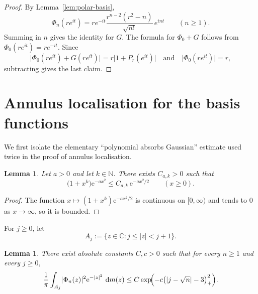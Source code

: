 \documentclass[11pt]{amsart}
\newtheorem{lemma}[theorem]{Lemma}
\theoremstyle{remark}
\newcommand{\C}{\mathbb{C}}
\newcommand{\N}{\mathbb{N}}
\newcommand{\abs}[1]{\lvert #1 \rvert}
\newcommand{\dd}{\,\mathrm{d}}
\newcommand{\ee}{\mathrm{e}}
\begin{document}
\begin{proof}
By Lemma~\ref{lem:polar-basis},
\[
\Phi_n(re^{it})
=
r e^{-it}\frac{r^{n-2}(r^2-n)}{\sqrt{n!}}\,e^{int}
\qquad (n \ge 1).
\]
Summing in $n$ gives the identity for $G$. The formula for $\Phi_0+G$ follows
from $\Phi_0(re^{it})=re^{-it}$. Since
\[
\abs{\Phi_0(re^{it}) + G(re^{it})}
=
r\abs{1 + P_r(e^{it})}
\quad \text{and} \quad
\abs{\Phi_0(re^{it})}=r,
\]
subtracting gives the last claim.
\end{proof}

\section{Annulus localisation for the basis functions}

We first isolate the elementary ``polynomial absorbs Gaussian'' estimate used
twice in the proof of annulus localisation.

\begin{lemma}\label{lem:poly-gauss}
Let $a>0$ and let $k \in \N$. There exists $C_{a,k}>0$ such that
\[
\bigl(1+x^k\bigr)\ee^{-a x^2}
\le
C_{a,k}\,\ee^{-a x^2/2}
\qquad
(x \ge 0).
\]
\end{lemma}

\begin{proof}
The function $x \mapsto (1+x^k)\ee^{-a x^2/2}$ is continuous on $[0,\infty)$
and tends to $0$ as $x\to\infty$, so it is bounded.
\end{proof}

For $j \ge 0$, let
\[
A_j := \{z \in \C : j \le \abs{z} < j+1\}.
\]

\begin{lemma}\label{lem:annulus-basis}
There exist absolute constants $C,c>0$ such that for every $n \ge 1$ and
every $j \ge 0$,
\[
\frac1\pi \int_{A_j} \abs{\Phi_n(z)}^2 \ee^{-\abs{z}^2}\,\dd m(z)
\le
C \exp\!\Bigl(-c\bigl(\abs{j-\sqrt n}-3\bigr)_+^2\Bigr).
\]
\end{lemma}
\end{document}
